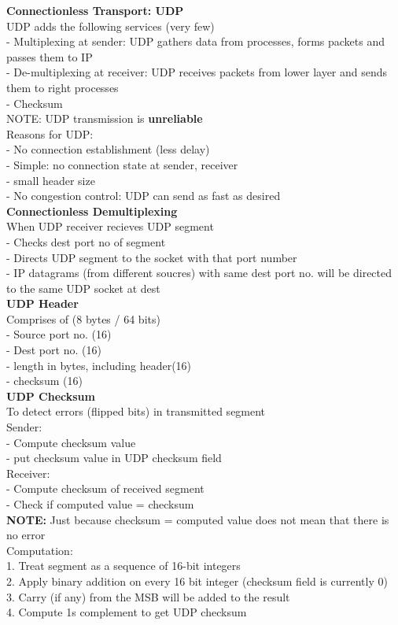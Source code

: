\documentclass[10pt, a4paper]{article}
\newcommand{\highlight}[1]{{\color{red}\textbf{#1}}}
\newcommand{\blue}[1]{{\color{MidnightBlue}#1}}
\newcommand{\red}[1]{{\color{red}#1}}
\begin{document}
\begin{multicols*}{3}
		\textbf{Connectionless Transport: UDP}\\
		UDP adds the following services (very few)\\
		- \blue{Multiplexing} at sender: UDP gathers data from processes, forms packets and passes them to IP\\
		- \blue{De-multiplexing} at receiver: UDP receives packets from lower layer and sends them to right processes\\
		- \blue{Checksum}\\
		\red{NOTE}: UDP transmission is \highlight{unreliable}\\
		Reasons for UDP:\\
		- No connection establishment (less delay)\\
		- Simple: no connection state at sender, receiver\\
		- small header size\\
		- No congestion control: UDP can send as fast as desired\\
		\textbf{Connectionless Demultiplexing}\\
		When UDP \red{receiver} recieves UDP segment\\
		- Checks \blue{dest port no} of segment\\
		- Directs UDP segment to the socket with that port number\\
		- IP datagrams (from different soucres) with \blue{same dest port no.} will be directed to the same UDP socket at dest\\
		\textbf{UDP Header}\\
		Comprises of (8 bytes / 64 bits)\\
		- Source port no. (16)\\
		- Dest port no. (16)\\
		- length \red{in bytes, including header}(16)\\
		- checksum (16)\\

		\textbf{UDP Checksum}\\
		To detect errors (flipped bits) in transmitted segment\\
		Sender:\\
		- Compute checksum value\\
		- put checksum value in UDP checksum field\\
		Receiver:\\
		- Compute checksum of received segment\\
		- Check if computed value = checksum\\
		\highlight{NOTE:} Just because checksum = computed value \red{does not} mean that there is no error\\
		Computation:\\
		1. Treat segment as a sequence of \blue{16-bit} integers\\
		2. Apply binary addition on every 16 bit integer (checksum field is currently 0)\\
		3. Carry (if any) from the MSB will be added to the result\\
		4. Compute 1s complement to get UDP checksum\\


\end{multicols*}
\end{document}
